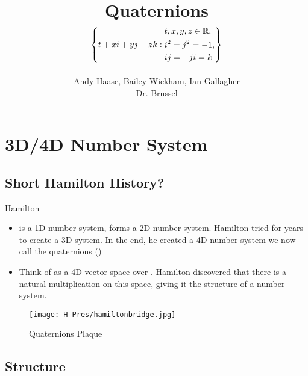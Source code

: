 \documentclass[t,slidestop,compress,mathserif,color=option,hyperref={pdfstartview={Fit},pdfpagelayout={SinglePage},pdfpagemode={UseOutlines}}]{beamer}
\begin{document}
\allowdisplaybreaks

\title[Quaternions]
    {Quaternions 
        \begin{align*}
            \left\{t+xi+yj+zk: 
            \begin{aligned}
                & t, x, y, z \in \protect\mathbb{R}, \\
                & i^2 = j^2 = -1, \\
                & ij = -ji = k 
            \end{aligned}
            \right\}
        \end{align*}     
    }
\author[Andy, Bailey, Ian]
    {Andy Haase, Bailey Wickham, Ian Gallagher \\ Dr. Brussel}

\begin{frame}
  \titlepage
\end{frame}

\section{3D/4D Number System}
\subsection{Short Hamilton History?}

\begin{frame}{Hamilton}
    \begin{itemize}
        \item \bR is a 1D number system, \bC forms a 2D number system.
            Hamilton tried for years to create a 3D system. In the end, he created a 4D number system we now call the quaternions (\bH)
        \item Think of \bH as a 4D vector space over \bR. Hamilton discovered that there is a natural multiplication on this space, giving it the structure of a number system. 
    \end{itemize}
    \begin{figure}
        \centering
        \texttt{[image: H Pres/hamiltonbridge.jpg]}
        \caption{Quaternions Plaque}
        \label{fig:hbridge}
    \end{figure}
\end{frame}

\subsection{Structure}
\end{document}
